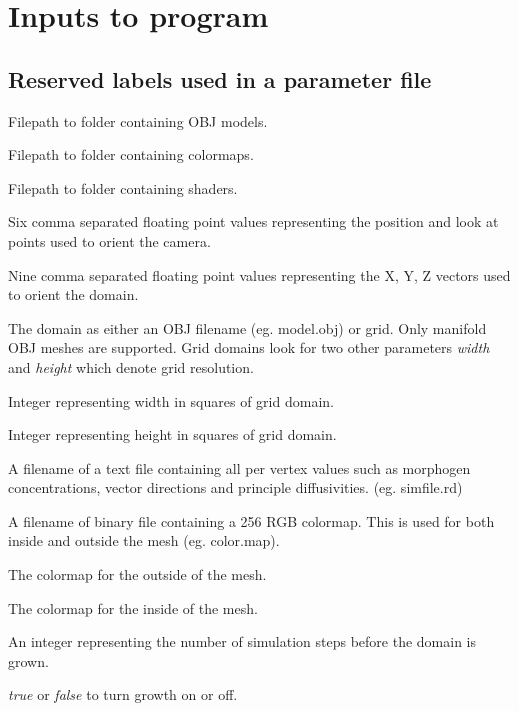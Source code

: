 \chapter{Inputs to program}
\section{Reserved labels used in a parameter file}
\label{appendix:Reservedlabels}

\begin{description}[itemsep=0cm]
    \item[ModelsPath:] Filepath to folder containing OBJ models.
    \item[ColorMapsPath:] Filepath to folder containing colormaps.
    \item[ShadersPath:] Filepath to folder containing shaders.
    \item[camera:] Six comma separated floating point values representing the position and look at points used to orient the camera.
    \item[model:] Nine comma separated floating point values representing the X, Y, Z vectors used to orient the domain. 
    \item[domain:] The domain as either an OBJ filename (eg. model.obj) or grid. Only manifold OBJ meshes are supported. Grid domains look for two other parameters \textit{width} and \textit{height} which denote grid resolution.
    \item[width:] Integer representing width in squares of grid domain.
    \item[height:] Integer representing height in squares of grid domain.
    \item[simFile:] A filename of a text file containing all per vertex values such as morphogen concentrations, vector directions and principle diffusivities. (eg. simfile.rd)
    \item[colorMap:] A filename of binary file containing a 256 RGB colormap. This is used for both inside and outside the mesh (eg. color.map).
    \item[colorMapOutside:] The colormap for the outside of the mesh.
    \item[colorMapInside:] The colormap for the inside of the mesh.
    \item[growthTickLimit:] An integer representing the number of simulation steps before the domain is grown.
    \item[growing:] \textit{true} or \textit{false} to turn growth on or off.

\end{description}
